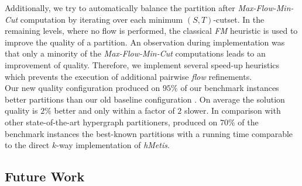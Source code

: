 Additionally, we try to automatically balance the partition after \emph{Max-Flow-Min-Cut}
computation by iterating over each minimum $(S,T)$-cutset. In the remaining levels, 
where no flow is performed, the classical \emph{FM} heuristic is used to improve the quality 
of a partition. An observation during implementation was that only a minority of 
the \emph{Max-Flow-Min-Cut} computations leads to an improvement of quality. 
Therefore, we implement several speed-up heuristics which prevents the
execution of additional pairwise \emph{flow} refinements. \\
Our new quality configuration  produced on $95\%$ of our benchmark instances
better partitions than our old baseline configuration . On average the solution 
quality is $2\%$ better and only within a factor of $2$ slower. In comparison with other 
state-of-the-art hypergraph partitioners,  produced on $70\%$ of the benchmark instances
the best-known partitions with a running time comparable to the direct $k$-way implementation
of \emph{hMetis}.


\subsection{Future Work}

